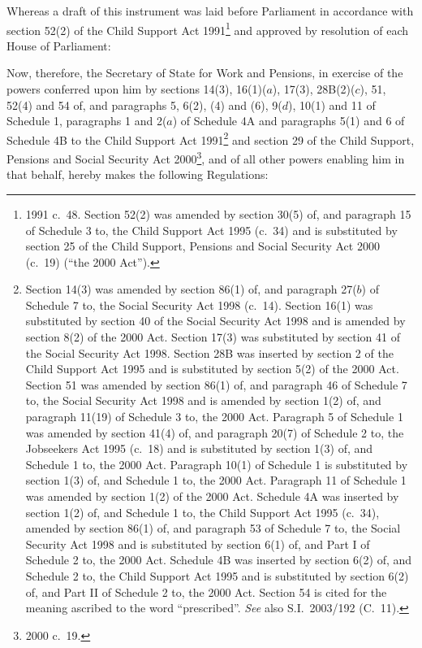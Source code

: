 \documentclass[12pt,a4paper]{article}
\title{\regstitle}
\author{S.I.\ 2004 No.\ 2415}
\date{Made
15th September 2004\\
Coming into force
in accordance with regulation 1(2)
}
\begin{document}
\maketitle

\noindent
Whereas a draft of this instrument was laid before Parliament in accordance with section 52(2) of the Child Support Act 1991\footnote{1991 c.\ 48. Section 52(2) was amended by section 30(5) of, and paragraph 15 of Schedule 3 to, the Child Support Act 1995 (c.\ 34) and is substituted by section 25 of the Child Support, Pensions and Social Security Act 2000 (c.\ 19) (“the 2000 Act”).} and approved by resolution of each House of Parliament:

Now, therefore, the Secretary of State for Work and Pensions, in exercise of the powers conferred upon him by sections 14(3), 16(1)($a$), 17(3), 28B(2)($c$), 51, 52(4) and 54 of, and paragraphs 5, 6(2), (4) and (6), 9($d$), 10(1) and 11 of Schedule 1, paragraphs 1 and 2($a$)  of Schedule 4A and paragraphs 5(1) and 6 of Schedule 4B to the Child Support Act 1991\footnote{Section 14(3) was amended by section 86(1) of, and paragraph 27($b$)  of Schedule 7 to, the Social Security Act 1998 (c.\ 14). Section 16(1) was substituted by section 40 of the Social Security Act 1998 and is amended by section 8(2) of the 2000 Act. Section 17(3) was substituted by section 41 of the Social Security Act 1998. Section 28B was inserted by section 2 of the Child Support Act 1995 and is substituted by section 5(2) of the 2000 Act. Section 51 was amended by section 86(1) of, and paragraph 46 of Schedule 7 to, the Social Security Act 1998 and is amended by section 1(2) of, and paragraph 11(19) of Schedule 3 to, the 2000 Act. Paragraph 5 of Schedule 1 was amended by section 41(4) of, and paragraph 20(7) of Schedule 2 to, the Jobseekers Act 1995 (c.\ 18) and is substituted by section 1(3) of, and Schedule 1 to, the 2000 Act. Paragraph 10(1) of Schedule 1 is substituted by section 1(3) of, and Schedule 1 to, the 2000 Act. Paragraph 11 of Schedule 1 was amended by section 1(2) of the 2000 Act. Schedule 4A was inserted by section 1(2) of, and Schedule 1 to, the Child Support Act 1995 (c.\ 34), amended by section 86(1) of, and paragraph 53 of Schedule 7 to, the Social Security Act 1998 and is substituted by section 6(1) of, and Part I of Schedule 2 to, the 2000 Act. Schedule 4B was inserted by section 6(2) of, and Schedule 2 to, the Child Support Act 1995 and is substituted by section 6(2) of, and Part II of Schedule 2 to, the 2000 Act. Section 54 is cited for the meaning ascribed to the word “prescribed”. \emph{See} also S.I.\ 2003/192 (C.\ 11).} and section 29 of the Child Support, Pensions and Social Security Act 2000\footnote{2000 c.\ 19.}, and of all other powers enabling him in that behalf, hereby makes the following Regulations: 
\end{document}
